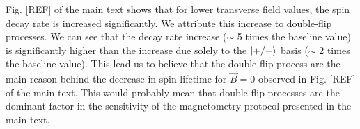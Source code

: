 \documentclass[preprintnumbers,amsmath,amssymb,onecolumn,12pt]{revtex4-2}
\begin{document}
Fig. [REF] of the main text shows that for lower transverse field values, the spin decay rate is increased significantly. We attribute this increase to double-flip processes. We can see that the decay rate increase ($\sim$ 5 times the baseline value) is significantly higher than the increase due solely to the $\ket{+/-}$ basis ($\sim$ 2 times the baseline value). This lead us to believe that the double-flip process are the main reason behind the decrease in spin lifetime for $\vec B=0$ observed in Fig. [REF] of the main text. This would probably mean that double-flip processes are the dominant factor in the sensitivity of the magnetometry protocol presented in the main text.

{}
\end{document}
